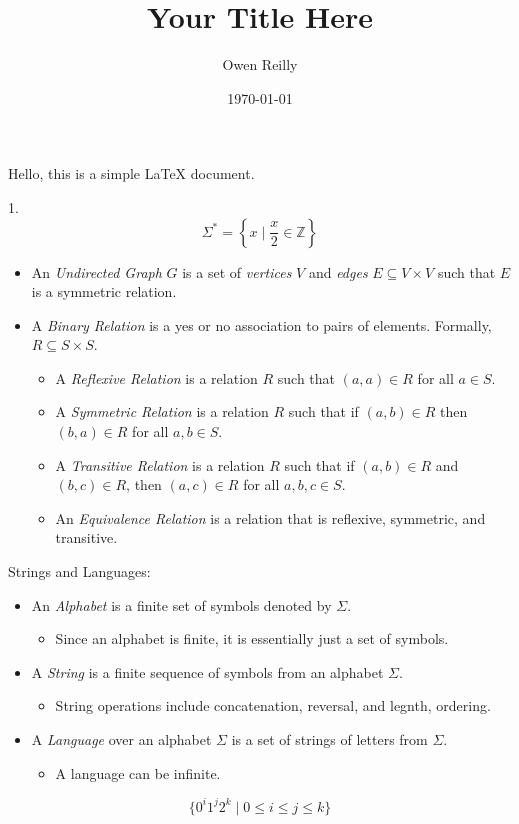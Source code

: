 \documentclass[11pt]{article}
\title{Your Title Here}
\author{Owen Reilly}
\date{\today}
\begin{document}
\maketitle

Hello, this is a simple LaTeX document.

1. \[\Sigma^* = \left\{ x \mid \frac{x}{2} \in \mathbb{Z} \right\}\]

\begin{itemize}
    \item An \emph{Undirected Graph} $G$ is a set of \emph{vertices} $V$ and \emph{edges} $E \subseteq V \times V$ such that $E$ is a symmetric relation.
    \item A \emph{Binary Relation} is a yes or no association to pairs of elements. Formally, $R \subseteq S \times S$.
	\begin{itemize}
    \item A \emph{Reflexive Relation} is a relation $R$ such that $(a, a) \in R$ for all $a \in S$.
    \item A \emph{Symmetric Relation} is a relation $R$ such that if $(a, b) \in R$ then $(b, a) \in R$ for all $a, b \in S$.
    \item A \emph{Transitive Relation} is a relation $R$ such that if $(a, b) \in R$ and $(b, c) \in R$, then $(a, c) \in R$ for all $a, b, c \in S$.
    \item An \emph{Equivalence Relation} is a relation that is reflexive, symmetric, and transitive.
\end{itemize}
\end{itemize}

Strings and Languages:

\begin{itemize}
    \item An \emph{Alphabet} is a finite set of symbols denoted by $\Sigma$.
    \begin{itemize}
        \item Since an alphabet is finite, it is essentially just a set of symbols.
    \end{itemize}
    \item A \emph{String} is a finite sequence of symbols from an alphabet $\Sigma$.
		\begin{itemize}
			\item String operations include concatenation, reversal, and legnth, ordering.
		\end{itemize}

    \item A \emph{Language} over an alphabet $\Sigma$ is a set of strings of letters from $\Sigma$. 
    \begin{itemize}
        \item A language can be infinite.
    \end{itemize}
\end{itemize}

$$\{0^i 1^j 2^k \mid 0 \leq i \leq j \leq k\}$$
\end{document}
